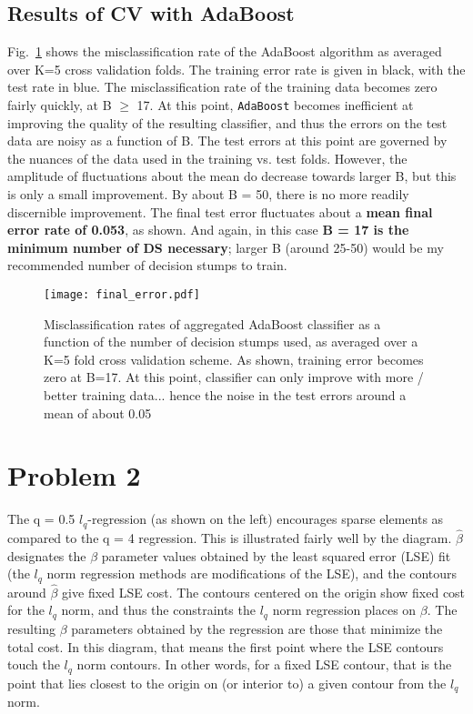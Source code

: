\documentclass[12pt]{article}%
\begin{document}
\subsection{Results of CV with AdaBoost}
Fig.~\ref{fig:errors} shows the misclassification rate of the AdaBoost algorithm as averaged over K=5 cross validation folds. The training error rate is given in black, with the test rate in blue. The misclassification rate of the training data becomes zero fairly quickly, at B $\ge$ 17. At this point, \texttt{AdaBoost} becomes inefficient at improving the quality of the resulting classifier, and thus the errors on the test data are noisy as a function of B. The test errors at this point are governed by the nuances of the data used in the training vs. test folds. However, the amplitude of fluctuations about the mean do decrease towards larger B, but this is only a small improvement. By about B = 50, there is no more readily discernible improvement. The final test error fluctuates about a \textbf{mean final error rate of 0.053}, as shown. And again, in this case \textbf{B = 17 is the minimum number of DS necessary}; larger B (around 25-50) would be my recommended number of decision stumps to train.



\begin{figure}[tb]
\center
\texttt{[image: final\_error.pdf]}
\caption{Misclassification rates of aggregated AdaBoost classifier as a function of the 
number of decision stumps used, as averaged over a K=5 fold cross validation scheme. As
shown, training error becomes zero at B=17. At this point, classifier can only improve
with more / better training data... hence the noise in the test errors around a mean
of about 0.05}
\label{fig:errors}
\end{figure}

\section{Problem 2}

The q = 0.5 $l_q$-regression (as shown on the left) encourages sparse elements as compared to the q = 4 regression. This is illustrated fairly well by the diagram. $\hat{\beta}$ designates the $\beta$ parameter values obtained by the least squared error (LSE) fit (the $l_q$ norm regression methods are modifications of the LSE), and the contours around $\hat{\beta}$ give fixed LSE cost. The contours centered on the origin show fixed cost for the $l_q$ norm, and thus the constraints the $l_q$ norm regression places on $\beta$. The resulting $\beta$ parameters obtained by the regression are those that minimize the total cost. In this diagram, that means the first point where the LSE contours touch the $l_q$ norm contours. In other words, for a fixed LSE contour, that is the point that lies closest to the origin on (or interior to) a given contour from the $l_q$ norm. 
\end{document}
